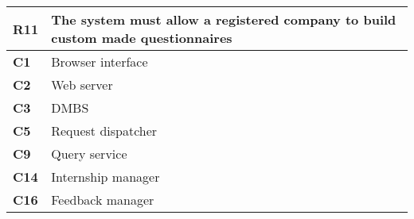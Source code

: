 \begin{table}[H]
    \centering
    \begin{tabular}{|l|m{10cm}|}
        \hline \textbf{R11} & The system must allow a registered company to build custom made questionnaires \\
        \hline \textbf{C1} & Browser interface \\
        \hline \textbf{C2} & Web server \\
        \hline \textbf{C3} & DMBS \\
        \hline \textbf{C5} & Request dispatcher \\
        \hline \textbf{C9} & Query service \\
        \hline \textbf{C14} & Internship manager \\
        \hline \textbf{C16} & Feedback manager \\
        \hline
    \end{tabular}
\end{table}

